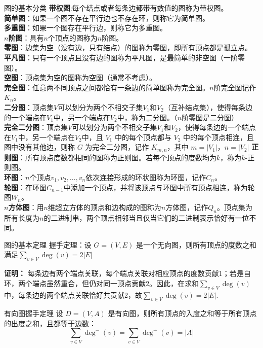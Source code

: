\documentclass[lang=cn,11pt]{elegantbook}
\begin{document}
\begin{definition}{图的基本分类}
\textbf{带权图}:每个结点或者每条边都带有数值的图称为带权图。\\
\textbf{简单图}：如果一个图不存在平行边也不存在环，则称它为简单图。\\
\textbf{多重图}：如果一个图存在平行边，则称它为多重图。\\
\textbf{$n$阶图}：具有$n$个顶点的图称为$n$阶图。\\
\textbf{零图}：边集为空（没有边，只有结点）的图称为零图，即所有顶点都是孤立点。\\
\textbf{平凡图}：只有一个顶点且没有边的图称为平凡图，是最简单的非空图（一阶零图）。\\
\textbf{空图}：顶点集为空的图称为空图（通常不考虑）。\\
\textbf{完全图}：任意两不同顶点之间都恰有一条边的简单图称为完全图。$n$阶完全图记作$K_n$。\\
\textbf{二分图}：顶点集$V$可以划分为两个不相交子集$V_1$和$V_2$（互补结点集），使得每条边的一个端点在$V_1$中，另一个端点在$V_2$中，称为二分图。（$n$阶零图是二分图）\\
\textbf{完全二分图}：顶点集$V$可以划分为两个不相交子集$V_1$和$V_2$，使得每条边的一个端点在$V_1$中，另一个端点在$V_2$中，且 $V_1$ 中的每个顶点都与 $V_2$ 中的每个顶点相连，且图中没有其他边，则称 $G$ 为完全二分图，记作 $K_{m,n}$，其中 $m = |V_1|$，$n = |V_2|$
\textbf{正则图}：所有顶点度数都相同的图称为正则图。若每个顶点的度数均为$k$，称为$k$-正则图。\\
\textbf{环图}：$n$个顶点$v_1,v_2,\ldots,v_n$依次连接形成的环状图称为环图，记作$C_n$。\\
\textbf{轮图}：在环图$C_{n-1}$中添加一个顶点，并将该顶点与环图中所有顶点相连，称为轮图$W_n$。\\
\textbf{$n$方体图}：用$n$维超立方体的顶点和边构成的图称为$n$方体图，记作$Q_n$。顶点集为所有长度为$n$的二进制串，两个顶点相邻当且仅当它们的二进制表示恰好有一位不同。
\end{definition}
\begin{theorem}{图的基本定理}
握手定理：设 $G = (V, E)$ 是一个无向图，则所有顶点的度数之和满足$\displaystyle\sum_{v \in V} \deg(v) = 2|E|$
\end{theorem}
\textbf{证明：} 每条边有两个端点关联，每个端点关联对相应顶点的度数贡献1；若是自环，两个端点虽然重合，但仍对同一顶点贡献2。因此，在求和$\sum_{v\in V}\deg(v)$中，每条边的两个端点关联恰好共贡献2，故$\displaystyle\sum_{v \in V} \deg(v) = 2|E|$.
\begin{theorem}{有向图握手定理}
设 $D = (V, A)$ 是有向图，则所有顶点的入度之和等于所有顶点的出度之和，且都等于边数：
\[
\sum_{v \in V} \deg^-(v) = \sum_{v \in V} \deg^+(v) = |A|
\]
\end{theorem}
\end{document}
